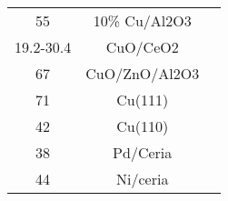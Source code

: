 \begin{center}
\begin{longtable}{ccc}
55                   & 10\% Cu/Al2O3           & \cite{Koryabkina_2003}         \\
19.2-30.4            & CuO/CeO2                & \cite{Koryabkina_2003}         \\
67                   & CuO/ZnO/Al2O3           & \cite{Koryabkina_2003}         \\
71                   & Cu(111)                 & \cite{Koryabkina_2003}         \\
42                   & Cu(110)                 & \cite{Koryabkina_2003}         \\
38                   & Pd/Ceria                & \cite{Hilaire_2001}         \\
44                   & Ni/ceria                & \cite{Hilaire_2001}         \\
\end{longtable}
\end{center}